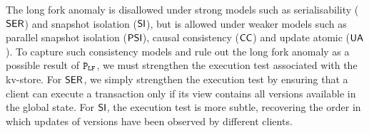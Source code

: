 The long fork anomaly is disallowed under strong models 
such as serialisability (\(\mathsf{SER}\)) and snapshot isolation (\(\mathsf{SI}\)), 
but is allowed under weaker models such as parallel snapshot isolation (\(\mathsf{PSI}\)), causal consistency (\(\mathsf{CC}\)) and update atomic (\( \mathsf{UA} \)).
To capture such consistency models and rule out the long fork anomaly as a possible result 
of \(\mathtt{P}_{\mathtt{LF}}\), we must strengthen the execution test associated with the kv-store.
For \(\mathsf{SER}\), we simply strengthen the execution test by ensuring that a client can execute a transaction 
only if its view contains all versions available in the global state.
For \(\mathsf{SI}\), the execution test is more subtle,  recovering  the order in which 
updates of versions have been observed by different clients. 

